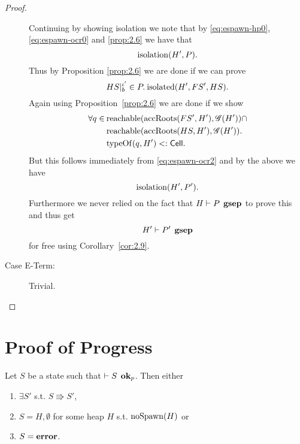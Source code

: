 \begin{proof}
\begin{description}
      Continuing by showing isolation we note that by \eqref{eq:espawn-hp0},
      \eqref{eq:espawn-ocr0} and \ref{prop:2.6} we have that
      \begin{equation}
        \mbox{$\mathrm{isolation}$}(H', P).
      \end{equation}
      Thus by Proposition \ref{prop:2.6} we are done if we can prove 
      \begin{equation}
        HS|_b^{\iota'} \in P. \: \mbox{$\mathrm{isolated}$}(H', FS', HS).
      \end{equation}
      Again using Proposition~\ref{prop:2.6} we are done if we show
      \begin{equation}
        \begin{aligned}
          \forall q \in \: &\mbox{$\mathrm{reachable}$}(\mbox{$\mathrm{accRoots}$}(FS', H'), \mathscr{G}(H')) \cap \\
            &\mbox{$\mathrm{reachable}$}(\mbox{$\mathrm{accRoots}$}(HS, H'), \mathscr{G}(H')) . \\
            &\mbox{$\mathrm{typeOf}$}(q, H') <: \mbox{$\mathsf{Cell}$}.
        \end{aligned}
      \end{equation}
      But this follows immediately from \eqref{eq:espawn-ocr2} and 
      by the above we have
      \begin{equation}
        \mbox{$\mathrm{isolation}$}(H', P').
      \end{equation} 
      Furthermore we never relied on the fact that $H \vdash P \:\: \mbox{\bf gsep}$ to
      prove this and thus get
      \begin{equation}
        H' \vdash P' \:\: \mbox{\bf gsep} 
      \end{equation}
      for free using Corollary~\ref{cor:2.9}.

    \item[Case {\sc E-Term}:] Trivial.
  \end{description}
\end{proof}


\section{Proof of Progress}
\label{sec:proof_of_progress}

\begin{theorem*}[Progress]
  Let $S$ be a state such that $\vdash S \:\: \mbox{{\bf ok}$_p$}$. Then either 
  \begin{enumerate}
    \item $\exists S'$ s.t. $S \Rrightarrow S'$, 
    \item $S = H, \emptyset$ for some heap $H$ s.t. $\mbox{$\mathrm{noSpawn}$}{(H)}$ or
    \item $S = \mbox{{\bf error}}$.
  \end{enumerate}
\end{theorem*}

